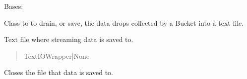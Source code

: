 \documentclass[letterpaper,10pt,english]{sphinxmanual}
\begin{document}
\begin{fulllineitems}
\label{\detokenize{Morelia.Stream.Drain:Morelia.Stream.Drain.ToText.DrainToTXT}}
\pysigstartsignatures
{}
\pysigstopsignatures
\sphinxAtStartPar
Bases: {\hyperref[\detokenize{Morelia.Stream.Drain:Morelia.Stream.Drain.ToFile.DrainToFile}]{}}

\sphinxAtStartPar
Class to to drain, or save, the data drops collected by a Bucket into a text file.

\begin{fulllineitems}
\label{\detokenize{Morelia.Stream.Drain:Morelia.Stream.Drain.ToText.DrainToTXT.file}}
\pysigstartsignatures
{}
\pysigstopsignatures
\sphinxAtStartPar
Text file where streaming data is saved to.
\begin{quote}\begin{description}
\sphinxAtStartPar
TextIOWrapper|None

\end{description}\end{quote}

\end{fulllineitems}


\begin{fulllineitems}
\label{\detokenize{Morelia.Stream.Drain:Morelia.Stream.Drain.ToText.DrainToTXT.CloseFile}}
\pysigstartsignatures
{}
\pysigstopsignatures
\sphinxAtStartPar
Closes the file that data is saved to.


\end{fulllineitems}
\end{fulllineitems}
\end{document}
